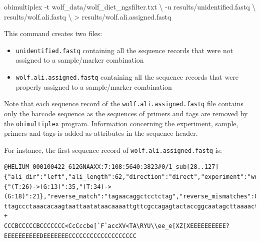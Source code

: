 \documentclass[
  letterpaper,
  DIV=11,
  numbers=noendperiod]{scrreprt}
\newenvironment{Shaded}{\begin{snugshade}}{\end{snugshade}}
\newcommand{\AttributeTok}[1]{\textcolor[rgb]{0.40,0.45,0.13}{#1}}
\newcommand{\DataTypeTok}[1]{\textcolor[rgb]{0.68,0.00,0.00}{#1}}
\newcommand{\ExtensionTok}[1]{\textcolor[rgb]{0.00,0.23,0.31}{#1}}
\newcommand{\NormalTok}[1]{\textcolor[rgb]{0.00,0.23,0.31}{#1}}
\newcommand{\OperatorTok}[1]{\textcolor[rgb]{0.37,0.37,0.37}{#1}}
\providecommand{\tightlist}{%
  \setlength{\itemsep}{0pt}\setlength{\parskip}{0pt}}\usepackage{longtable,booktabs,array}
\begin{document}
\begin{Shaded}
\begin{Highlighting}[]
\ExtensionTok{obimultiplex} \AttributeTok{{-}t}\NormalTok{ wolf\_data/wolf\_diet\_ngsfilter.txt }\DataTypeTok{\textbackslash{}}
             \AttributeTok{{-}u}\NormalTok{ results/unidentified.fastq }\DataTypeTok{\textbackslash{}}
\NormalTok{             results/wolf.ali.fastq }\DataTypeTok{\textbackslash{}}
             \OperatorTok{\textgreater{}}\NormalTok{ results/wolf.ali.assigned.fastq}
\end{Highlighting}
\end{Shaded}

This command creates two files:

\begin{itemize}
\tightlist
\item
  \texttt{unidentified.fastq} containing all the sequence records that
  were not assigned to a sample/marker combination
\item
  \texttt{wolf.ali.assigned.fastq} containing all the sequence records
  that were properly assigned to a sample/marker combination
\end{itemize}

Note that each sequence record of the \texttt{wolf.ali.assigned.fastq}
file contains only the barcode sequence as the sequences of primers and
tags are removed by the \texttt{obimultiplex} program. Information
concerning the experiment, sample, primers and tags is added as
attributes in the sequence header.

For instance, the first sequence record of
\texttt{wolf.ali.assigned.fastq} is:

\begin{verbatim}
@HELIUM_000100422_612GNAAXX:7:108:5640:3823#0/1_sub[28..127] {"ali_dir":"left","ali_length":62,"direction":"direct","experiment":"wolf_diet","forward_match":"ttagataccccactatgc","forward_mismatches":0,"forward_primer":"ttagataccccactatgc","forward_tag":"gcctcct","mode":"alignment","pairing_mismatches":{"(T:26)->(G:13)":35,"(T:34)->(G:18)":21},"reverse_match":"tagaacaggctcctctag","reverse_mismatches":0,"reverse_primer":"tagaacaggctcctctag","reverse_tag":"gcctcct","sample":"29a_F260619","score":484,"score_norm":0.968,"seq_a_single":46,"seq_ab_match":60,"seq_b_single":46}
ttagccctaaacacaagtaattaatataacaaaattgttcgccagagtactaccggcaatagcttaaaactcaaaggacttggcggtgctttataccctt
+
CCCBCCCCCBCCCCCCC<CcCccbe[`F`accXV<TA\RYU\\ee_e[XZ[XEEEEEEEEEE?EEEEEEEEEEDEEEEEEECCCCCCCCCCCCCCCCCCC
\end{verbatim}
\end{document}
